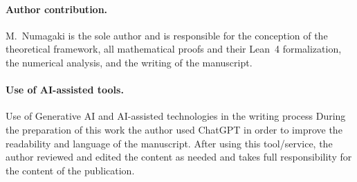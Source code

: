 \documentclass[sn-mathphys-num,Numbered]{sn-jnl}
\theoremstyle{thmstyleone}
\theoremstyle{thmstylethree}
\begin{document}
\paragraph{Author contribution.}
M.~Numagaki is the sole author and is responsible for the
conception of the theoretical framework,
all mathematical proofs and their Lean~4 formalization,
the numerical analysis, and the writing of the manuscript.

\paragraph{Use of AI-assisted tools.}
Use of Generative AI and AI-assisted technologies in the writing process
During the preparation of this work the author used ChatGPT in order to improve the readability and language of the manuscript. After using this tool/service, the author reviewed and edited the content as needed and takes full responsibility for the content of the publication.
\end{document}
